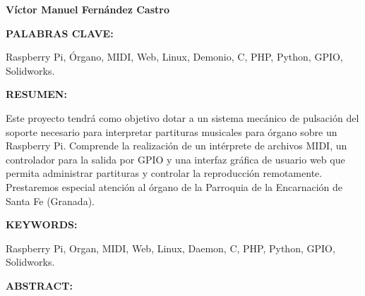 \begin{center}
\textbf{\large Víctor Manuel Fernández Castro}
\par\end{center}{\large \par}

\vspace{0.75cm}






\begin{doublespace}
\noindent \textbf{PALABRAS CLAVE:}
\end{doublespace}



\begin{singlespace}
\noindent Raspberry Pi, Órgano, MIDI, Web, Linux, Demonio, C, PHP, Python, GPIO, Solidworks.

\end{singlespace}

\begin{doublespace}
\noindent \textbf{RESUMEN:}
\end{doublespace}

\begin{singlespace}

\noindent Este proyecto tendrá como objetivo dotar a un sistema mecánico de pulsación del soporte necesario para interpretar partituras musicales para órgano sobre un Raspberry Pi. Comprende la realización de un intérprete de archivos MIDI, un controlador para la salida por GPIO y una interfaz gráfica de usuario web que permita administrar partituras y controlar la reproducción remotamente. Prestaremos especial atención al órgano de la Parroquia de la Encarnación de Santa Fe (Granada).
\end{singlespace}

\vspace{1.25cm}

\begin{doublespace}
\noindent \textbf{KEYWORDS:}
\end{doublespace}

\begin{singlespace}
\noindent Raspberry Pi, Organ, MIDI, Web, Linux, Daemon, C, PHP, Python, GPIO, Solidworks.
\end{singlespace}

\begin{doublespace}
\noindent \textbf{ABSTRACT:}
\end{doublespace}

